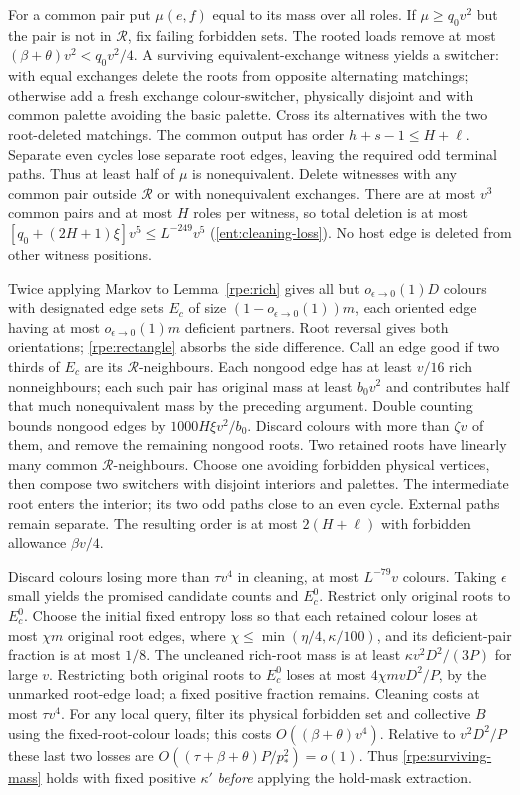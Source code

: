 For a common pair put $\mu(e,f)$ equal to its mass over all roles. If $\mu\ge{}q_0v^2$ but the pair is not in $\mathcal{R}$, fix failing forbidden sets. The rooted loads remove at most $(\beta+\theta)v^2<q_0v^2/4$. A surviving equivalent-exchange witness yields a switcher: with equal exchanges delete the roots
from opposite alternating matchings; otherwise add a fresh exchange
colour-switcher, physically disjoint and with common palette avoiding
the basic palette. Cross its alternatives with the two root-deleted
matchings. The common output has order $h+s-1\le{}H+\ell$. Separate even cycles lose separate root edges, leaving the required
odd terminal paths. Thus at least half of $\mu$ is nonequivalent. Delete witnesses with any common pair outside $\mathcal{R}$ or with nonequivalent exchanges. There are at most $v^3$ common pairs and at most $H$ roles per witness, so total deletion is at most \label{ent:cleaning-loss}$[q_0+(2H+1)\xi]v^5\le{}L^{-249}v^5$ \textup{(\ref{ent:cleaning-loss})}. No host edge is deleted from other witness positions.

Twice applying Markov to Lemma~\ref{rpe:rich} gives all but $o_{\epsilon\to0}(1)D$ colours with designated edge sets $E_c$ of size $(1-o_{\epsilon\to0}(1))m$, each oriented edge having at most $o_{\epsilon\to0}(1)m$ deficient partners. Root reversal gives both orientations; \eqref{rpe:rectangle} absorbs the side difference.
Call an edge good if two thirds of $E_c$ are its $\mathcal{R}$-neighbours. Each nongood edge has at least $v/16$ rich nonneighbours; each such pair has original mass at least $b_0v^2$ and contributes half that much nonequivalent mass by the preceding argument. Double counting
bounds nongood edges by $1000H\xi{}v^2/b_0$. Discard colours with more than $\zeta{}v$ of them, and remove the remaining nongood roots. Two retained roots have linearly many common $\mathcal{R}$-neighbours. Choose one avoiding forbidden physical vertices, then compose two
switchers with disjoint interiors and palettes. The intermediate root
enters the interior; its two odd paths close to an even cycle.
External paths remain separate. The resulting order is at most $2(H+\ell)$ with forbidden allowance $\beta{}v/4$.

Discard colours losing more than $\tau{}v^4$ in cleaning, at most $L^{-79}v$ colours. Taking $\epsilon$ small yields the promised candidate counts and $E_c^0$. Restrict only original roots to $E_c^0$. Choose the initial fixed entropy loss so that each retained colour
loses at most $\chi{}m$ original root edges, where $\chi\le\min(\eta/4,\kappa/100)$, and its deficient-pair fraction is at most $1/8$. The uncleaned rich-root mass is at least $\kappa{}v^2D^2/(3P)$ for large $v$. Restricting both original roots to $E_c^0$ loses at most $4\chi{}mvD^2/P$, by the unmarked root-edge load; a fixed positive fraction remains. Cleaning costs
at most $\tau{}v^4$. For any local query, filter its physical forbidden set and collective $B$ using the fixed-root-colour loads; this costs $O((\beta+\theta)v^4)$. Relative to $v^2D^2/P$ these last two losses are $O((\tau+\beta+\theta)P/p_*^2)=o(1)$. Thus \eqref{rpe:surviving-mass} holds with fixed positive $\kappa'$ \emph{before} applying the hold-mask extraction.

